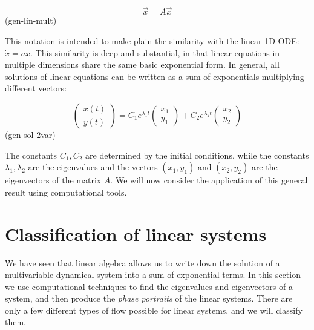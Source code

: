 \documentclass[
  letterpaper,
  DIV=11,
  numbers=noendperiod]{scrreprt}
\begin{document}
\[
\dot{ \vec{ x}} = A \vec{x}
\] (gen-lin-mult)

This notation is intended to make plain the similarity with the linear
1D ODE: \(\dot x = a x\). This similarity is deep and substantial, in
that linear equations in multiple dimensions share the same basic
exponential form. In general, all solutions of linear equations can be
written as a sum of exponentials multiplying different vectors:

\begin{tcolorbox}[enhanced jigsaw, colbacktitle=quarto-callout-tip-color!10!white, leftrule=.75mm, coltitle=black, left=2mm, breakable, opacityback=0, colback=white, toprule=.15mm, opacitybacktitle=0.6, bottomtitle=1mm, colframe=quarto-callout-tip-color-frame, rightrule=.15mm, bottomrule=.15mm, toptitle=1mm, titlerule=0mm, arc=.35mm, title={General solution of linear 2-variable ODEs}]
\[
\left(\begin{array}{c} x(t) \\  y(t) \end{array}\right) =C_1e^{\lambda_1 t} \left(\begin{array}{c}x_1\\y_1\end{array}\right)+C_2 e^{\lambda_2 t}\left(\begin{array}{c}x_2\\y_2\end{array}\right)
\] (gen-sol-2var)

The constants \(C_1, C_2\) are determined by the initial conditions,
while the constants \(\lambda_1, \lambda_2\) are the eigenvalues and the
vectors \((x_1,y_1)\) and \((x_2,y_2)\) are the eigenvectors of the
matrix \(A\). We will now consider the application of this general
result using computational tools.
\end{tcolorbox}

\hypertarget{classification-of-linear-systems}{%
\section{Classification of linear
systems}\label{classification-of-linear-systems}}

We have seen that linear algebra allows us to write down the solution of
a multivariable dynamical system into a sum of exponential terms. In
this section we use computational techniques to find the eigenvalues and
eigenvectors of a system, and then produce the \emph{phase portraits} of
the linear systems. There are only a few different types of flow
possible for linear systems, and we will classify them.
\end{document}
